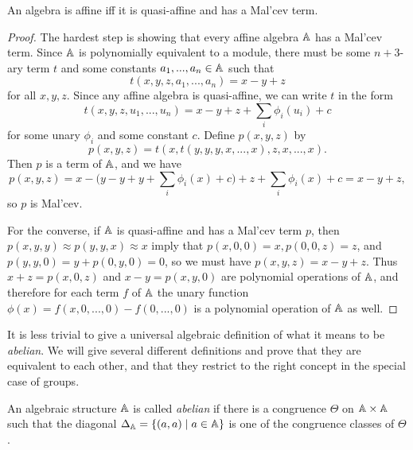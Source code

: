 \documentclass[letterpaper,11pt]{article}
\begin{document}
\begin{prop}\label{affine-malcev} An algebra is affine iff it is quasi-affine and has a Mal'cev term.
\end{prop}
\begin{proof} The hardest step is showing that every affine algebra $\mathbb{A}$ has a Mal'cev term. Since $\mathbb{A}$ is polynomially equivalent to a module, there must be some $n+3$-ary term $t$ and some constants $a_1, ..., a_n \in \mathbb{A}$ such that
\[
t(x,y,z,a_1, ..., a_n) = x-y+z
\]
for all $x,y,z$. Since any affine algebra is quasi-affine, we can write $t$ in the form
\[
t(x,y,z,u_1,...,u_n) = x-y+z + \sum_i \phi_i(u_i) + c
\]
for some unary $\phi_i$ and some constant $c$. Define $p(x,y,z)$ by
\[
p(x,y,z) = t(x,t(y,y,y,x,...,x),z,x,...,x).
\]
Then $p$ is a term of $\mathbb{A}$, and we have
\[
p(x,y,z) = x-\big(y-y+y + \sum_i \phi_i(x) + c\big)+z + \sum_i \phi_i(x) + c = x-y+z,
\]
so $p$ is Mal'cev.

For the converse, if $\mathbb{A}$ is quasi-affine and has a Mal'cev term $p$, then $p(x,y,y) \approx p(y,y,x) \approx x$ imply that $p(x,0,0) = x, p(0,0,z) = z$, and $p(y,y,0) = y + p(0,y,0) = 0$, so we must have $p(x,y,z) = x-y+z$. Thus $x+z = p(x,0,z)$ and $x-y = p(x,y,0)$ are polynomial operations of $\mathbb{A}$, and therefore for each term $f$ of $\mathbb{A}$ the unary function $\phi(x) = f(x,0,...,0) - f(0,...,0)$ is a polynomial operation of $\mathbb{A}$ as well.
\end{proof}


It is less trivial to give a universal algebraic definition of what it means to be \emph{abelian}. We will give several different definitions and prove that they are equivalent to each other, and that they restrict to the right concept in the special case of groups.

\begin{defn} An algebraic structure $\mathbb{A}$ is called \emph{abelian} if there is a congruence $\Theta$ on $\mathbb{A}\times \mathbb{A}$ such that the diagonal $\Delta_{\mathbb{A}} = \{(a,a) \mid a \in \mathbb{A}\}$ is one of the congruence classes of $\Theta$.
\end{defn}
\end{document}

